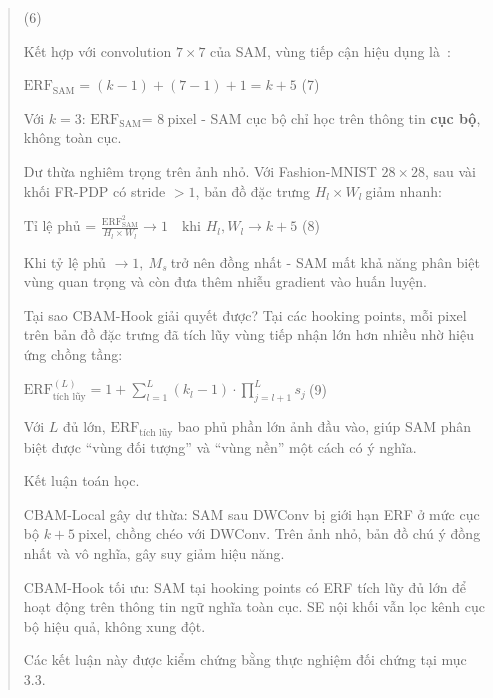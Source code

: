 \documentclass[
]{article}
\begin{document}
\begin{quote}
(6)

Kết hợp với convolution \(7 \times 7\) của SAM, vùng tiếp cận hiệu dụng
là~:

\(\text{ERF}_{\text{SAM}} = (k - 1) + (7 - 1) + 1 = k + 5\) (7)

Với \(k = 3\): \(\text{ERF}_{\text{SAM}}\)= 8\(\ \)pixel - SAM cục bộ
chỉ học trên thông tin \textbf{cục bộ}, không toàn cục.

Dư thừa nghiêm trọng trên ảnh nhỏ. Với Fashion-MNIST \(28 \times 28\),
sau vài khối FR-PDP có stride \(> 1\), bản đồ đặc trưng
\(H_{l} \times W_{l}\ \)giảm nhanh:

\(\text{Tỉ~lệ~phủ}\) =
\(\frac{\text{ERF}_{\text{SAM}}^{2}}{H_{l} \times W_{l}} \rightarrow 1\quad\text{khi~}H_{l},W_{l} \rightarrow k + 5\)
(8)

Khi tỷ lệ phủ \(\rightarrow 1,\ M_{s}\ \)trở nên đồng nhất - SAM mất khả
năng phân biệt vùng quan trọng và còn đưa thêm nhiễu gradient vào huấn
luyện.

Tại sao CBAM-Hook giải quyết được? Tại các hooking points, mỗi pixel
trên bản đồ đặc trưng đã tích lũy vùng tiếp nhận lớn hơn nhiều nhờ hiệu
ứng chồng tầng:

\(\text{ERF}_{\text{t}\text{í}\text{ch}\text{~}\text{l}\text{ũ}\text{y}}^{(L)} = 1 + \sum_{l = 1}^{L}\left( k_{l} - 1 \right) \cdot \prod_{j = l + 1}^{L}s_{j}\ \)(9)

Với \(L\) đủ lớn,
\(\text{ERF}_{\text{t}\text{í}\text{ch}\text{~}\text{l}\text{ũ}\text{y}}\)
bao phủ phần lớn ảnh đầu vào, giúp SAM phân biệt được ``vùng đối tượng''
và ``vùng nền'' một cách có ý nghĩa.

Kết luận toán học.

CBAM-Local gây dư thừa: SAM sau DWConv bị giới hạn ERF ở mức cục bộ
\(k + 5\ \)pixel, chồng chéo với DWConv. Trên ảnh nhỏ, bản đồ chú ý đồng
nhất và vô nghĩa, gây suy giảm hiệu năng.

CBAM-Hook tối ưu: SAM tại hooking points có ERF tích lũy đủ lớn để hoạt
động trên thông tin ngữ nghĩa toàn cục. SE nội khối vẫn lọc kênh cục bộ
hiệu quả, không xung đột.

Các kết luận này được kiểm chứng bằng thực nghiệm đối chứng tại mục 3.3.
\end{quote}
\end{document}
